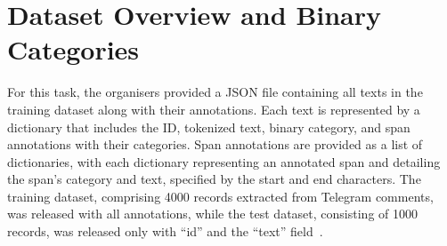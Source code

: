 \documentclass{Configuration_Files/PoliMi3i_thesis}
\begin{document}
\section{Dataset Overview and Binary Categories} \label{dataset_overview_and_binary_categories}
For this task, the organisers provided a JSON file containing all texts in the training dataset along with their annotations. Each text is represented by a dictionary that includes the ID, tokenized text, binary category, and span annotations with their categories. Span annotations are provided as a list of dictionaries, with each dictionary representing an annotated span and detailing the span's category and text, specified by the start and end characters. The training dataset, comprising 4000 records extracted from Telegram comments, was released with all annotations, while the test dataset, consisting of 1000 records, was released only with ``id'' and the ``text'' field~\cite{korencic2024oppositional,bevendorff:2024}.
\end{document}
